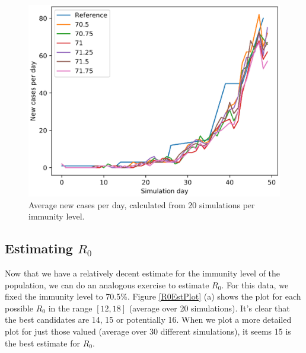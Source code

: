 \documentclass[runningheads]{llncs}
\begin{document}
\begin{figure}[H]
\includegraphics[width=\textwidth]{ImmLvl.eps}
\caption{Average new cases per day, calculated from 20 simulations per immunity level.} 
\label{immLvlPlot}
\end{figure}


\subsection{Estimating $R_{0}$}
Now that we have a relatively decent estimate for the immunity level of the population, we can do an analogous exercise to estimate $R_0$. For this data, we fixed the immunity level to 70.5\%. Figure \ref{R0EstPlot} (a) shows the plot for each possible $R_0$ in the range $[12, 18]$ (average over 20 simulations). It's clear that the best candidates are 14, 15 or potentially 16. When we plot a more detailed plot for just those valued (average over 30 different simulations), it seems 15 is the best estimate for $R_0$.
\end{document}
